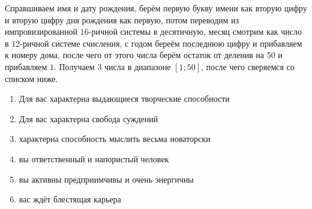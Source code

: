 \documentclass[a4paper, 12pt]{article}
\begin{document}
\clearpage\pagestyle{empty}
Справшиваем имя и дату рождения, берём первую букву имени как вторую цифру и вторую цифру дня рождения как первую, потом переводим из импровизированной $16$-ричной системы в десятичную, месяц смотрим как число в $12$-ричной системе счисления, с годом береём последнюю цифру и прибавляем к номеру дома, после чего от этого числа берём остаток от деления на $50$ и прибавляем $1$. Получаем $3$ числа в диапазоне $[1;50]$, после чего сверяемся со списком ниже.
\begin{multicols*}{2}
    \begin{enumerate}
        \item Для вас характерна выдающиеся творческие способности
        \item Для вас характерна свобода суждений
        \item характерна способность мыслить весьма новаторски
        \item вы ответственный и напористый человек
        \item вы активны предприимчивы и очень энергичны
        \item вас ждёт блестящая карьера

\end{enumerate}
\end{multicols*}
\end{document}
